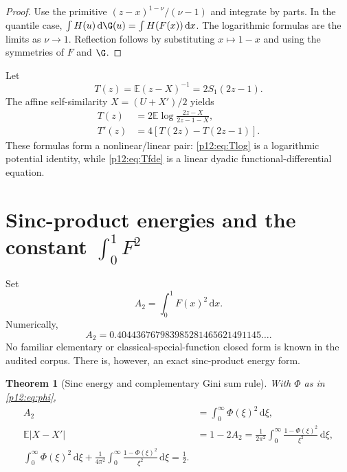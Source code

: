 \documentclass[11pt,oneside]{article}
\newtheorem{theorem}{Theorem}[section]
\theoremstyle{definition}
\theoremstyle{remark}
\newcommand{\F}{F}
\newcommand{\E}{\mathbb E}
\newcommand{\dd}{\,\mathrm d}
\newcommand{\1}{\mathbf 1}
\begin{document}
\begin{proof}
Use the primitive
\((z-x)^{1-\nu}/(\nu-1)\) and integrate by parts.  In the quantile case,
\(\int H(u)\dd\G(u)=\int H(\F(x))\dd x\).  The logarithmic formulas are the
limits as \(\nu\to1\).  Reflection follows by substituting \(x\mapsto1-x\) and
using the symmetries of \(\F\) and \(\G\).
\end{proof}

Let
\begin{equation}\label{p12:eq:Tdef}
 T(z)=\E(z-X)^{-1}=2S_1(2z-1).
\end{equation}
The affine self-similarity \(X=(U+X')/2\) yields
\begin{align}
 T(z)&=2\E\log\frac{2z-X}{2z-1-X},\label{p12:eq:Tlog}\\
 T'(z)&=4[T(2z)-T(2z-1)].\label{p12:eq:Tfde}
\end{align}
These formulas form a nonlinear/linear pair: \eqref{p12:eq:Tlog} is a logarithmic
potential identity, while \eqref{p12:eq:Tfde} is a linear dyadic
functional-differential equation.

\section{Sinc-product energies and the constant \(\int_0^1\F^2\)}

Set
\begin{equation}
 A_2=\int_0^1\F(x)^2\dd x.
\end{equation}
Numerically,
\begin{equation}\label{p12:eq:A2numeric}
 A_2=0.404436767983985281465621491145\ldots.
\end{equation}
No familiar elementary or classical-special-function closed form is known in
the audited corpus.  There is, however, an exact sinc-product energy form.

\begin{theorem}[Sinc energy and complementary Gini sum rule\tagnew]
With \(\Phi\) as in \eqref{p12:eq:phi},
\begin{align}
 A_2&=\int_0^\infty\Phi(\xi)^2\dd\xi,\label{p12:eq:A2Phi}\\
 \E|X-X'|&=1-2A_2
 =\frac1{2\pi^2}\int_0^\infty
 \frac{1-\Phi(\xi)^2}{\xi^2}\dd\xi,\label{p12:eq:GiniPhi}\\
 \boxed{
 \int_0^\infty\Phi(\xi)^2\dd\xi
 +\frac1{4\pi^2}\int_0^\infty
 \frac{1-\Phi(\xi)^2}{\xi^2}\dd\xi=\frac12.}
 \label{p12:eq:sumrule}
\end{align}
\end{theorem}
\end{document}
